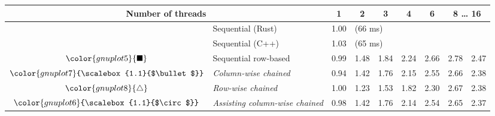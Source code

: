 \begin{tabular}{clrrrrrrr}
\toprule
\multicolumn{2}{c}{\textbf{Number of threads}} & \multicolumn{1}{c}{\textbf{ 1 }} & \multicolumn{1}{c}{\textbf{ 2 }} & \multicolumn{1}{c}{\textbf{ 3 }} & \multicolumn{1}{c}{\textbf{ 4 }} & \multicolumn{1}{c}{\textbf{ 6 }} & \multicolumn{2}{c}{\textbf{ 8 } \dots \textbf{ 16 }} \\
\midrule
& Sequential (Rust) & \multicolumn{1}{r}{ 1.00 } & \multicolumn{ 6 }{l}{(66 ms)} \\
& Sequential (C++) & \multicolumn{1}{r}{ 1.03 } & \multicolumn{ 6 }{l}{(65 ms)} \\
\rowcolor{gnuplot5!10}$\color{gnuplot5}{\blacksquare}$ & Sequential row-based & \cellcolor{gnuplot5!10} 0.99 & \cellcolor{gnuplot5!10} 1.48 & \cellcolor{gnuplot5!10} 1.84 & \cellcolor{gnuplot5!10} 2.24 & \cellcolor{gnuplot5!10} 2.66 & \cellcolor{gnuplot5!10} 2.78 & \cellcolor{gnuplot5!10} 2.47 \\
\rowcolor{gnuplot7!30}$\color{gnuplot7}{\scalebox{1.1}{$\bullet$}}$ & \textit{Column-wise chained} & \cellcolor{gnuplot7!30} 0.94 & \cellcolor{gnuplot7!30} 1.42 & \cellcolor{gnuplot7!30} 1.76 & \cellcolor{gnuplot7!30} 2.15 & \cellcolor{gnuplot7!30} 2.55 & \cellcolor{gnuplot7!30} 2.66 & \cellcolor{gnuplot7!30} 2.38 \\
\rowcolor{gnuplot8!30}$\color{gnuplot8}{\triangle}$ & \textit{Row-wise chained} & \cellcolor{gnuplot8!30} 1.00 & \cellcolor{gnuplot8!30} 1.23 & \cellcolor{gnuplot8!30} 1.53 & \cellcolor{gnuplot8!30} 1.82 & \cellcolor{gnuplot8!30} 2.30 & \cellcolor{gnuplot8!30} 2.67 & \cellcolor{gnuplot8!30} 2.38 \\
\rowcolor{gnuplot6!30}$\color{gnuplot6}{\scalebox{1.1}{$\circ$}}$ & \textit{Assisting column-wise chained} & \cellcolor{gnuplot6!30} 0.98 & \cellcolor{gnuplot6!30} 1.42 & \cellcolor{gnuplot6!30} 1.76 & \cellcolor{gnuplot6!30} 2.14 & \cellcolor{gnuplot6!30} 2.54 & \cellcolor{gnuplot6!30} 2.65 & \cellcolor{gnuplot6!30} 2.37 \\
\bottomrule
\end{tabular}
